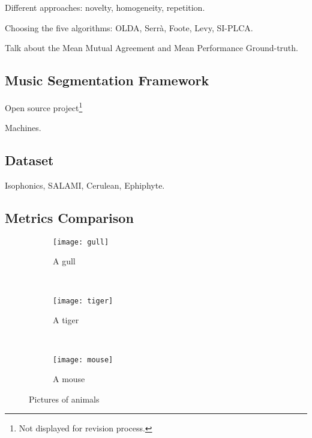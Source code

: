 \documentclass{article}
\begin{document}
Different approaches: novelty, homogeneity, repetition.

Choosing the five algorithms: OLDA\cite{McFee2014}, Serr\`a\cite{Serra2013},
Foote\cite{Foote1999}, Levy\cite{Levy2008}, SI-PLCA\cite{Weiss2011}.

Talk about the Mean Mutual Agreement and Mean Performance Ground-truth\cite{Holzapfel2012}.

\subsection{Music Segmentation Framework}

Open source project\footnote{Not displayed for revision process.}

Machines.

\subsection{Dataset}

Isophonics, SALAMI\cite{Smith2011}, Cerulean, Ephiphyte.

\subsection{Metrics Comparison}

\begin{figure}
        \centering
        \begin{subfigure}[b]{0.3\textwidth}
                \texttt{[image: gull]}
                \caption{A gull}
                \label{fig:gull}
        \end{subfigure}%
        ~ %
        \begin{subfigure}[b]{0.3\textwidth}
                \texttt{[image: tiger]}
                \caption{A tiger}
                \label{fig:tiger}
        \end{subfigure}
        ~ %
        \begin{subfigure}[b]{0.3\textwidth}
                \texttt{[image: mouse]}
                \caption{A mouse}
                \label{fig:mouse}
        \end{subfigure}
        \caption{Pictures of animals}\label{fig:animals}
\end{figure}
\end{document}
